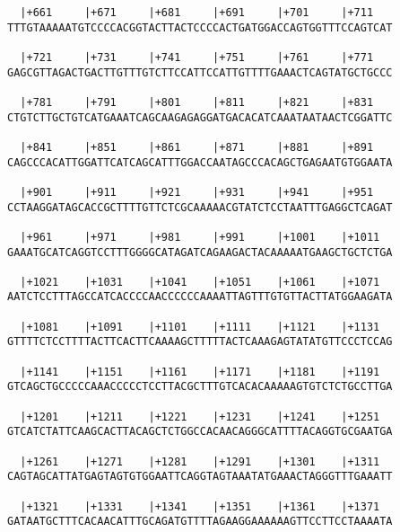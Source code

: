 \documentclass{article}
\begin{document}
\begin{Verbatim}
  |+661     |+671     |+681     |+691     |+701     |+711   
TTTGTAAAAATGTCCCCACGGTACTTACTCCCCACTGATGGACCAGTGGTTTCCAGTCAT
                                                            
  |+721     |+731     |+741     |+751     |+761     |+771   
GAGCGTTAGACTGACTTGTTTGTCTTCCATTCCATTGTTTTGAAACTCAGTATGCTGCCC
                                                            
  |+781     |+791     |+801     |+811     |+821     |+831   
CTGTCTTGCTGTCATGAAATCAGCAAGAGAGGATGACACATCAAATAATAACTCGGATTC
                                                            
  |+841     |+851     |+861     |+871     |+881     |+891   
CAGCCCACATTGGATTCATCAGCATTTGGACCAATAGCCCACAGCTGAGAATGTGGAATA
                                                            
  |+901     |+911     |+921     |+931     |+941     |+951   
CCTAAGGATAGCACCGCTTTTGTTCTCGCAAAAACGTATCTCCTAATTTGAGGCTCAGAT
                                                            
  |+961     |+971     |+981     |+991     |+1001    |+1011  
GAAATGCATCAGGTCCTTTGGGGCATAGATCAGAAGACTACAAAAATGAAGCTGCTCTGA
                                                            
  |+1021    |+1031    |+1041    |+1051    |+1061    |+1071  
AATCTCCTTTAGCCATCACCCCAACCCCCCAAAATTAGTTTGTGTTACTTATGGAAGATA
                                                            
  |+1081    |+1091    |+1101    |+1111    |+1121    |+1131  
GTTTTCTCCTTTTACTTCACTTCAAAAGCTTTTTACTCAAAGAGTATATGTTCCCTCCAG
                                                            
  |+1141    |+1151    |+1161    |+1171    |+1181    |+1191  
GTCAGCTGCCCCCAAACCCCCTCCTTACGCTTTGTCACACAAAAAGTGTCTCTGCCTTGA
                                                            
  |+1201    |+1211    |+1221    |+1231    |+1241    |+1251  
GTCATCTATTCAAGCACTTACAGCTCTGGCCACAACAGGGCATTTTACAGGTGCGAATGA
                                                            
  |+1261    |+1271    |+1281    |+1291    |+1301    |+1311  
CAGTAGCATTATGAGTAGTGTGGAATTCAGGTAGTAAATATGAAACTAGGGTTTGAAATT
                                                            
  |+1321    |+1331    |+1341    |+1351    |+1361    |+1371  
GATAATGCTTTCACAACATTTGCAGATGTTTTAGAAGGAAAAAAGTTCCTTCCTAAAATA
                                                            

\end{Verbatim}
\end{document}

